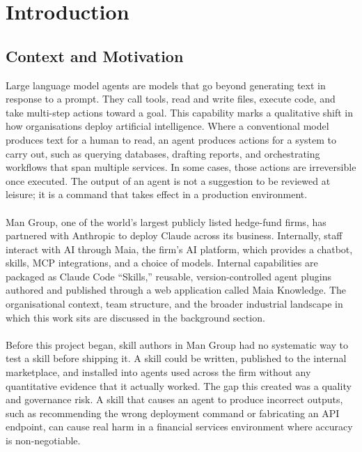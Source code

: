 \chapter{Introduction}


\section{Context and Motivation}
Large language model agents are models that go beyond generating text in response to a prompt. They call tools, read and write files, execute code, and take multi-step actions toward a goal. This capability marks a qualitative shift in how organisations deploy artificial intelligence. Where a conventional model produces text for a human to read, an agent produces actions for a system to carry out, such as querying databases, drafting reports, and orchestrating workflows that span multiple services. In some cases, those actions are irreversible once executed. The output of an agent is not a suggestion to be reviewed at leisure; it is a command that takes effect in a production environment.
\\\\
Man Group, one of the world's largest publicly listed hedge-fund firms, has partnered with Anthropic to deploy Claude across its business. Internally, staff interact with AI through Maia, the firm's AI platform, which provides a chatbot, skills, MCP integrations, and a choice of models. Internal capabilities are packaged as Claude Code ``Skills,'' reusable, version-controlled agent plugins authored and published through a web application called Maia Knowledge. The organisational context, team structure, and the broader industrial landscape in which this work sits are discussed in the background section.
\\\\
Before this project began, skill authors in Man Group had no systematic way to test a skill before shipping it. A skill could be written, published to the internal marketplace, and installed into agents used across the firm without any quantitative evidence that it actually worked. The gap this created was a quality and governance risk. A skill that causes an agent to produce incorrect outputs, such as recommending the wrong deployment command or fabricating an API endpoint, can cause real harm in a financial services environment where accuracy is non-negotiable.

